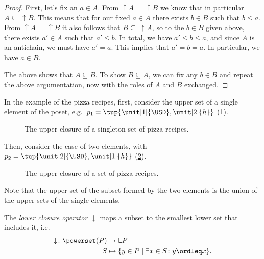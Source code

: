 \begin{proof}
    First, let's fix an $a \in A$. From $\uparrow A = \ \uparrow B$ we know that in particular $A \subseteq \ \uparrow B$. This means that for our fixed $a \in A$ there exists $b \in B$ such that $b \leq a$. From $\uparrow A = \ \uparrow B$ it also follows that $B \subseteq \ \uparrow A$, so to the  $b \in B$ given above, there exists $a' \in A$ such that $a' \leq b$. In total, we have $a' \leq b \leq a$, and since $A$ is an antichain, we must have $a' = a$. This implies that $a' = b = a$. In particular, we have $a \in B$.

    The above shows that $A \subseteq B$. To show $B \subseteq A$, we can fix any $b \in B$ and repeat the above argumentation, now with the roles of $A$ and $B$ exchanged.
\end{proof}

In the example of the pizza recipes, first, consider the upper set of a single element of the poset, e.g.~$p_1=\tup{\unit[1]{\USD},\unit[2]{h}}$  (\cref{fig:upperclosure_1}).
\begin{figure}[h!]
    \begin{center}
    \end{center}
    \caption{The upper closure of a singleton set of pizza recipes. \label{fig:upperclosure_1}}
\end{figure}
Then, consider the case of two elements, with~$p_2=\tup{\unit[2]{\USD},\unit[1]{h}}$ (\cref{fig:upperclosure_2}).

\begin{figure}[h!]
    \begin{center}
    \end{center}
    \caption{The upper closure of a set of pizza recipes. \label{fig:upperclosure_2}}
\end{figure}
Note that the upper set of the subset formed by the two elements is the union of the upper sets of the single elements.

\begin{definition}
    The \emph{lower closure operator} $\downarrow$ maps a subset to the smallest lower set that includes it, i.e.
    \begin{equation*}
        \begin{aligned}
            \downarrow\colon \powerset(P)&\to \mathsf{L}P\\
            S&\mapsto \{ y\in P \mid \exists x\in S \colon y\ordleq x\}.
        \end{aligned}
    \end{equation*}
\end{definition}

